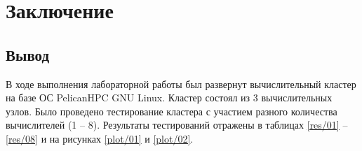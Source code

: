 \chapter{Заключение}

\section{Вывод}

В ходе выполнения лабораторной работы был развернут вычислительный кластер на базе ОС PelicanHPC GNU Linux. Кластер состоял из 3 вычислительных узлов. Было проведено тестирование кластера с участием разного количества вычислителей (1 -- 8). Результаты тестирований отражены в таблицах \ref{res/01} -- \ref{res/08} и на рисунках \ref{plot/01} и \ref{plot/02}.